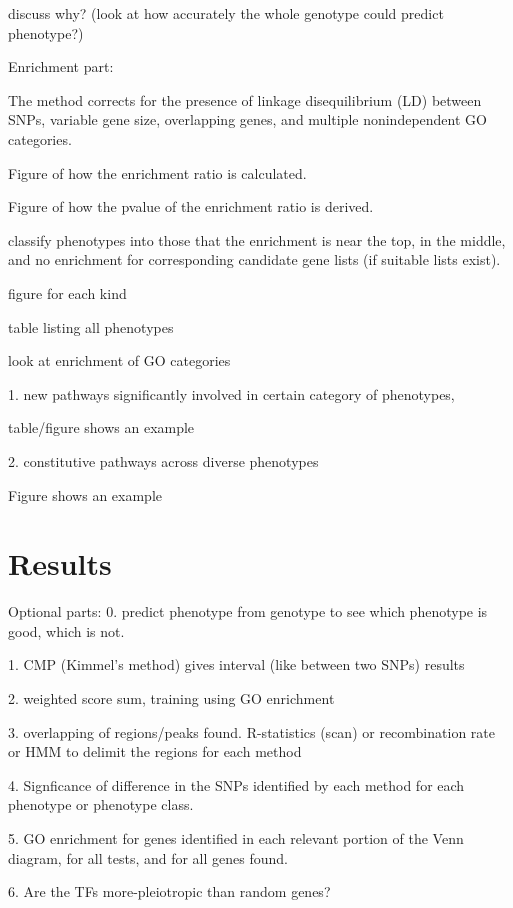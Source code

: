 \documentclass[10pt]{article}
\begin{document}
discuss why? (look at how accurately the whole genotype could predict phenotype?)


Enrichment part:

The method corrects for the presence of linkage disequilibrium (LD) between SNPs, variable gene size, overlapping genes, and multiple nonindependent GO categories.

	Figure of how the enrichment ratio is calculated.

	Figure of how the pvalue of the enrichment ratio is derived.

classify phenotypes into those that the enrichment is near the top, in the middle, and no enrichment for corresponding candidate gene lists (if suitable lists exist).
	
	figure for each kind

	table listing all phenotypes

look at enrichment of GO categories

1. new pathways significantly involved in certain category of phenotypes,

	table/figure shows an example

2. constitutive pathways across diverse phenotypes

	Figure shows an example



\section*{Results}



Optional parts:
0. predict phenotype from genotype to see which phenotype is good, which is not.

1. CMP (Kimmel's method) gives interval (like between two SNPs) results

2. weighted score sum, training using GO enrichment

3. overlapping of regions/peaks found. R-statistics (scan) or recombination rate or HMM to delimit the regions for each method

4. Signficance of difference in the SNPs identified by each method for each phenotype or phenotype class.

5. GO enrichment for genes identified in each relevant portion of the Venn diagram, for all tests, and for all genes found.

6. Are the TFs more-pleiotropic than random genes?
\end{document}

